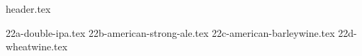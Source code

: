 \clearpage
{}
\divisorLine

{header.tex}

\begin{multicols}{2}

{22a-double-ipa.tex}
{22b-american-strong-ale.tex}
{22c-american-barleywine.tex}
{22d-wheatwine.tex}

\end{multicols}